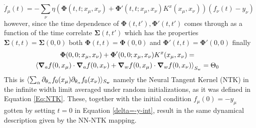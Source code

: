 \begin{equation}
    \dot{f}_\mu(t)=-\sum\limits_{\nu}\eta\left(\bm{\Phi}(t,t;x_\mu,x_\nu)+\bm{\Phi}'(t,t;x_\mu,x_\nu) K^x(x_\mu,x_\nu) \right) (f_\nu(t)-y_\nu)
\end{equation}
however, since the time dependence of $\bm{\Phi}(t,t'),\bm{\Phi}'(t,t')$ comes through as a function of the time correlate $\bm{\Sigma}(t,t')$ which has the properties $\bm{\Sigma}(t,t)=\bm{\Sigma}(0,0)$ both $\bm{\Phi}(t,t)=\bm{\Phi}(0,0)$ and $\bm{\Phi}'(t,t)=\bm{\Phi}'(0,0)$
finally
\begin{gather}
    \bm{\Phi}(0,0;x_\mu,x_\nu)+ \bm{\Phi}'(0,0;x_\mu,x_\nu) K^x(x_\mu,x_\nu)=\notag\\\left\langle\bm{\nabla}_a f(0,x_\mu)\cdot\bm{\nabla}_af(0,x_\nu)+\bm{\nabla}_w f(0,x_\mu)\cdot\bm{\nabla}_w f(0,x_\nu)\right\rangle_{S_{\rm w}}=\Theta_0
\end{gather}
This is $\langle\sum_{\alpha} \partial_{\theta_{\alpha}}f_0(x_{\mu}) \partial_{\theta_{\alpha}}f_0(x_{\nu})\rangle_{S_{\rm w}}$ namely the Neural Tangent Kernel (NTK) in the infinite width limit averaged under random initializations, as it was defined in Equation \ref{Eq:NTK}. 
These, together with the initial condition $f_{\mu}(0)=-y_{\mu}$ gotten by setting $t=0$ in Equation \ref{delta=-y-int}, result in the same dynamical description given by the NN-NTK mapping.

